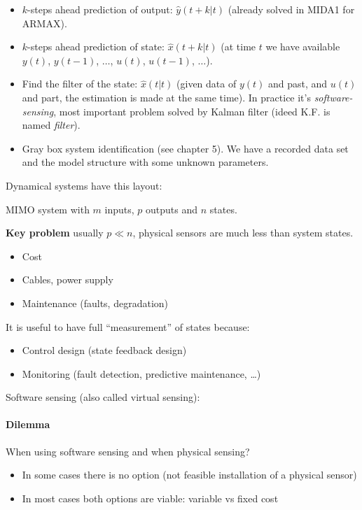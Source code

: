 \begin{itemize}
    \item $k$-steps ahead prediction of output: $\hat{y}(t+k|t)$ (already solved in MIDA1 for ARMAX).
    \item $k$-steps ahead prediction of state: $\hat{x}(t+k|t)$ (at time $t$ we have available $y(t)$, $y(t-1)$, $\ldots$, $u(t)$, $u(t-1)$, $\ldots$).
    \item Find the filter of the state: $\hat{x}(t|t)$ (given data of $y(t)$ and past, and $u(t)$ and part, the estimation is made at the same time). In practice it's \emph{software-sensing}, most important problem solved by Kalman filter (ideed K.F. is named \emph{filter}).
    \item Gray box system identification (see chapter 5). We have a recorded data set and the model structure with some unknown parameters.
\end{itemize}


Dynamical systems have this layout:

MIMO system with $m$ inputs, $p$ outputs and $n$ states.

\textbf{Key problem} usually $p \ll n$, physical sensors are much less than system states.
\begin{itemize}
    \item Cost
    \item Cables, power supply
    \item Maintenance (faults, degradation)
\end{itemize}

It is useful to have full ``measurement'' of states because:
\begin{itemize}
    \item Control design (state feedback design)
    \item Monitoring (fault detection, predictive maintenance, \dots)
\end{itemize}

Software sensing (also called virtual sensing):

\paragraph{Dilemma} When using software sensing and when physical sensing?
\begin{itemize}
    \item In some cases there is no option (not feasible installation of a physical sensor)
    \item In most cases both options are viable: variable vs fixed cost
\end{itemize}

